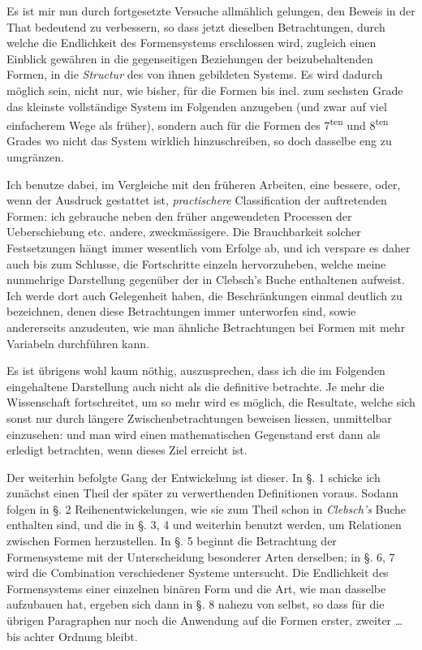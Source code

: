 \documentclass[10pt]{article}
\begin{document}
Es ist mir nun durch fortgesetzte Versuche allmählich gelungen, den Beweis in der That bedeutend zu verbessern, so dass jetzt dieselben Betrachtungen, durch welche die Endlichkeit des Formensystems erschlossen wird, zugleich einen Einblick gewähren in die gegenseitigen Beziehungen der beizubehaltenden Formen, in die \emph{Structur} des von ihnen gebildeten Systems. Es wird dadurch möglich sein, nicht nur, wie bisher, für die Formen bis incl. zum sechsten Grade das kleinste vollständige System im Folgenden anzugeben (und zwar auf viel einfacherem Wege als früher), sondern auch für die Formen des 7\textsuperscript{ten} und 8\textsuperscript{ten} Grades wo nicht das System wirklich hinzuschreiben, so doch dasselbe eng zu umgränzen.

Ich benutze dabei, im Vergleiche mit den früheren Arbeiten, eine bessere, oder, wenn der Ausdruck gestattet ist, \emph{practischere} Classification der auftretenden Formen: ich gebrauche neben den früher angewendeten Processen der Ueberschiebung etc. andere, zweckmässigere. Die Brauchbarkeit solcher Festsetzungen hängt immer wesentlich vom Erfolge ab, und ich verspare es daher auch bis zum Schlusse, die Fortschritte einzeln hervorzuheben, welche meine nunmehrige Darstellung gegenüber der in Clebsch's Buche enthaltenen aufweist. Ich werde dort auch Gelegenheit haben, die Beschränkungen einmal deutlich zu bezeichnen, denen diese Betrachtungen immer unterworfen sind, sowie andererseits anzudeuten, wie man ähnliche Betrachtungen bei Formen mit mehr Variabeln durchführen kann.

Es ist übrigens wohl kaum nöthig, auszusprechen, dass ich die im Folgenden eingehaltene Darstellung auch nicht als die definitive betrachte. Je mehr die Wissenschaft fortschreitet, um so mehr wird es möglich, die Resultate, welche sich sonst nur durch längere Zwischenbetrachtungen beweisen liessen, unmittelbar einzusehen: und man wird einen mathematischen Gegenstand erst dann als erledigt betrachten, wenn dieses Ziel erreicht ist.

Der weiterhin befolgte Gang der Entwickelung ist dieser. In §. 1 schicke ich zunächst einen Theil der später zu verwerthenden Definitionen voraus. Sodann folgen in §. 2 Reihenentwickelungen, wie sie zum Theil schon in \emph{Clebsch's} Buche enthalten sind, und die in §. 3, 4 und weiterhin benutzt werden, um Relationen zwischen Formen herzustellen. In §. 5 beginnt die Betrachtung der Formensysteme mit der Unterscheidung besonderer Arten derselben; in §. 6, 7 wird die Combination verschiedener Systeme untersucht. Die Endlichkeit des Formensystems einer einzelnen binären Form und die Art, wie man dasselbe aufzubauen hat, ergeben sich dann in §. 8 nahezu von selbst, so dass für die übrigen Paragraphen nur noch die Anwendung auf die Formen erster, zweiter \ldots{} bis achter Ordnung bleibt.
\end{document}
